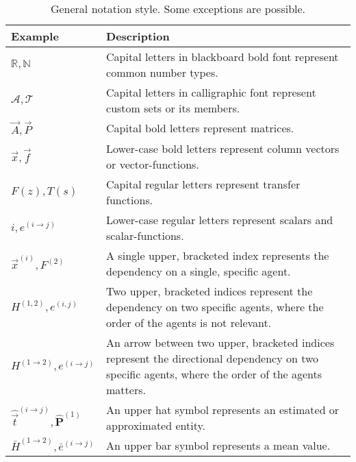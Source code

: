 \chanumfalse
{} %
\begin{table}[h]
	\renewcommand{\arraystretch}{1.4}
	\begin{tabularx}{1\textwidth}{@{}lX@{}}
		\toprule
		\textbf{Example} & \textbf{Description}  \\ \midrule
		$\mathbb{R}, \mathbb{N}$ 	& Capital letters in blackboard bold font represent common number types. \\
		$\mathcal{A}, \mathcal{T}$ 	& Capital letters in calligraphic font represent custom sets or its members. \\
		$\vec{A}, \vec{P}$ 			& Capital bold letters represent matrices.	\\
		$\vec{x}, \vec{f}$			& Lower-case bold letters represent column vectors or vector-functions. \\
		$F(z), T(s)$				& Capital regular letters represent transfer functions.	\\		
		$i, e^{(i \rightarrow j)}$	& Lower-case regular letters represent scalars and scalar-functions.\\
		$\vec{x}^{(i)}, F^{(2)}$	
			& A single upper, bracketed index represents the dependency on a single, specific agent.\\
		$ H^{(1, 2)}, e^{(i, j)}$ 
			& Two upper, bracketed indices represent the dependency on two specific agents, where the order of the agents is not relevant.\\
		$ H^{(1 \rightarrow 2)}, e^{(i \rightarrow j)}$
			& An arrow between two upper, bracketed indices represent the directional dependency on two specific agents, where the order of the agents matters.\\
		$\hat{\vec{t}}^{(i \rightarrow j)}, \hat{\mathbf{P}}^{(1)}$ 
	     	& An upper hat symbol represents an estimated or approximated entity.\\	
		$\bar H^{(1 \rightarrow 2)}, \bar e^{(i \rightarrow j)}$
	     	& An upper bar symbol represents a mean value.\\	
		\bottomrule
	\end{tabularx}
	\caption[General notation style]{General notation style. Some exceptions are possible.}
\end{table}

